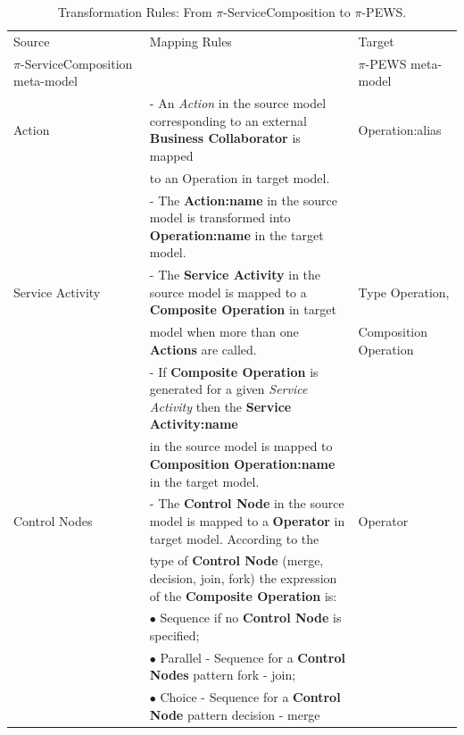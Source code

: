 \begin{table}[ht!]
\tiny
\renewcommand{\arraystretch}{1.3}
\caption{Transformation Rules: From $\pi$-ServiceComposition to $\pi$-PEWS.}
\label{tab:transformationServiceCompositionToPEWS}
\centering
\begin{tabular}{l|l|l}
    \hline
    Source  &  Mapping Rules & Target\\
    $\pi$-ServiceComposition meta-model  &   & $\pi$-PEWS meta-model\\
    \hline
    \hline

    Action   &  - An \textit{Action} in the source model corresponding to an
    external \textbf{Business Collaborator} is mapped  & Operation:alias\\
       &   to an Operation in target model.   & \\
       &   - The \textbf{Action:name} in the source model is transformed into
       \textbf{Operation:name} in the target model.  & \\
    \hline

    Service Activity    & - The \textbf{Service Activity} in the source model is
    mapped to a \textbf{Composite Operation} in target  & Type Operation,\\
        &  model when more than one \textbf{Actions} are called.   &
        Composition Operation\\

        & - If \textbf{Composite Operation} is generated for a given
        \textit{Service Activity} then the \textbf{Service Activity:name} & \\
        & in the source model is mapped to
        \textbf{Composition Operation:name} in the target model. &\\
    \hline

    Control Nodes   &  - The \textbf{Control Node} in the source model is mapped
    to a \textbf{Operator} in target model. According to the & Operator\\

    & type of \textbf{Control Node} (merge, decision, join, fork)
    the expression of the \textbf{Composite Operation} is: & \\

    &  $\bullet$ Sequence if no \textbf{Control Node} is specified;  & \\
    &  $\bullet$ Parallel - Sequence for  a \textbf{Control Nodes} pattern fork -
    join; & \\ &
    $\bullet$ Choice - Sequence for a \textbf{Control Node} pattern decision -
    merge &
    \\


\end{tabular}
\end{table}
